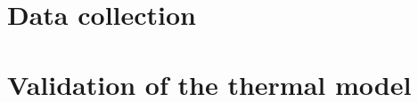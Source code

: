 
\section{Data collection}
\label{datacollection}

\section{Validation of the thermal model}
\label{validationthermalmodel}



